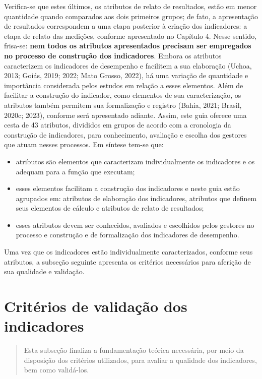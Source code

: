 \documentclass[
  letterpaper,
  DIV=11,
  numbers=noendperiod]{scrreprt}
\begin{document}
Verifica-se que estes últimos, os atributos de relato de resultados,
estão em menor quantidade quando comparados aos dois primeiros grupos;
de fato, a apresentação de resultados correspondem a uma etapa posterior
à criação dos indicadores: a etapa de relato das medições, conforme
apresentado no Capítulo 4. Nesse sentido, frisa-se: \textbf{nem todos os
atributos apresentados precisam ser empregados no processo de construção
dos indicadores}. Embora os atributos caracterizem os indicadores de
desempenho e facilitem a sua elaboração (Uchoa, 2013; Goiás, 2019; 2022;
Mato Grosso, 2022), há uma variação de quantidade e importância
considerada pelos estudos em relação a esses elementos. Além de
facilitar a construção do indicador, como elementos de sua
caracterização, os atributos também permitem sua formalização e registro
(Bahia, 2021; Brasil, 2020c; 2023), conforme será apresentado adiante.
Assim, este guia oferece uma cesta de 43 atributos, divididos em grupos
de acordo com a cronologia da construção de indicadores, para
conhecimento, avaliação e escolha dos gestores que atuam nesses
processos. Em síntese tem-se que:

\begin{itemize}
\item
  atributos são elementos que caracterizam individualmente os
  indicadores e os adequam para a função que executam;
\item
  esses elementos facilitam a construção dos indicadores e neste guia
  estão agrupados em: atributos de elaboração dos indicadores, atributos
  que definem seus elementos de cálculo e atributos de relato de
  resultados;
\item
  esses atributos devem ser conhecidos, avaliados e escolhidos pelos
  gestores no processo e construção e de formalização dos indicadores de
  desempenho.
\end{itemize}

Uma vez que os indicadores estão individualmente caracterizados,
conforme seus atributos, a subseção seguinte apresenta os critérios
necessários para aferição de sua qualidade e validação.

\hypertarget{crituxe9rios-de-validauxe7uxe3o-dos-indicadores}{%
\chapter{Critérios de validação dos
indicadores}\label{crituxe9rios-de-validauxe7uxe3o-dos-indicadores}}

\begin{quote}
Esta subseção finaliza a fundamentação teórica necessária, por meio da
disposição dos critérios utilizados, para avaliar a qualidade dos
indicadores, bem como validá-los.
\end{quote}
\end{document}

